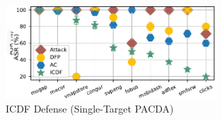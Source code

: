 \documentclass[conference,compsoc]{IEEEtran} %
\begin{document}
\begin{figure}[h!]
	\centering
	\includegraphics[keepaspectratio,height=3.5cm]{Graph/Evaluation/Figure-last_1.pdf}
	\caption{ICDF Defense (Single-Target PACDA)}
	\label{fig:APIGraph-targeted-defense}
\end{figure}
\end{document}
